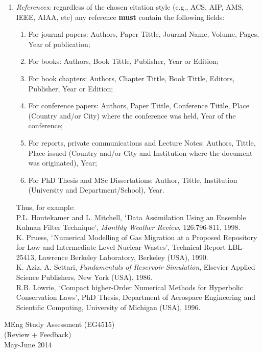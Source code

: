 \documentclass[14pt,twoside]{report}
\begin{document}
\begin{enumerate}
%
\item {\it References}: regardless of the chosen citation style (e.g., ACS, AIP, AMS, IEEE, AIAA, etc) any reference {\bf must} contain the following fields: 
\begin{enumerate}
\item For journal papers: Authors, Paper Tittle, Journal Name, Volume, Pages, Year of publication;
\item For books: Authors, Book Tittle, Publisher, Year or Edition;
\item For book chapters: Authors, Chapter Tittle, Book Tittle, Editors, Publisher, Year or Edition;
\item For conference papers: Authors, Paper Tittle, Conference Tittle, Place (Country and/or City) where the conference was held, Year of the conference;
\item For reports,  private communications and Lecture Notes: Authors, Tittle, Place issued (Country and/or City and Institution where the document was originated), Year;
\item For PhD Thesis and MSc Dissertations: Author, Tittle, Institution (University and Department/School), Year.
\end{enumerate}  
Thus, for example:\\
\noindent
[39] P.L. Houtekamer and L. Mitchell, $\lq$Data Assimilation Using an Ensemble Kalman Filter Technique', {\it Monthly Weather Review}, 126:796-811, 1998.\\
\noindent
[40] K. Pruess, $\lq$Numerical Modelling of Gas Migration at a Proposed Repository for Low and Intermediate Level Nuclear Wastes', Technical Report LBL-25413, Lawrence Berkeley Laboratory, Berkeley (USA), 1990.\\
\noindent
[41] K. Aziz, A. Settari, {\it Fundamentals of Reservoir Simulation}, Elsevier Applied Science Publishers, New York (USA), 1986.\\
\noindent
[42] R.B. Lowrie, $\lq$Compact higher-Order Numerical Methods for Hyperbolic Conservation Laws', PhD Thesis, Department of Aerospace Engineering and Scientific Computing, University of Michigan (USA), 1996.
%
\end{enumerate}

\clearpage


\begin{center}
\Huge{MEng Study Assessment (EG4515)}\\
\huge{(Review + Feedback)}\\
\huge{May-June 2014}
\end{center}
\end{document}
